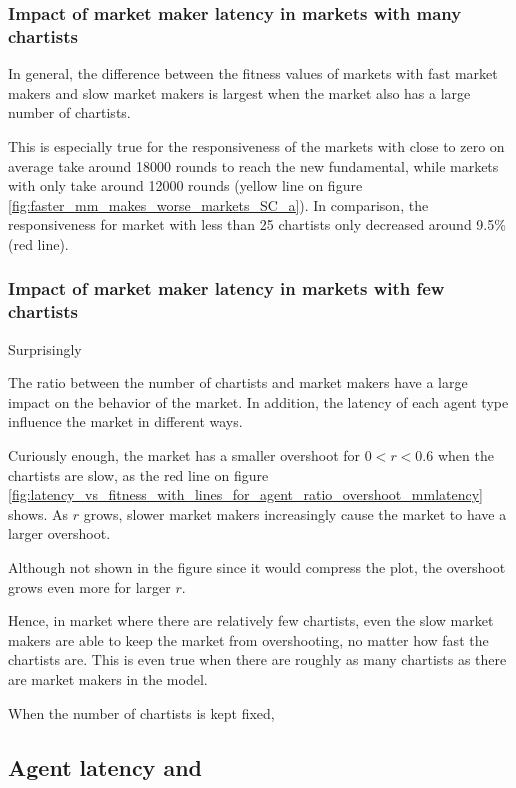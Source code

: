 \subsubsection*{Impact of market maker latency in markets with many chartists}
In general, the difference between the fitness values of markets with fast market makers and slow market makers is largest when the market also has a large number of chartists. 


This is especially true for the responsiveness of the markets with \ssmmlatencymu close to zero on average take around 18000 rounds to reach the new fundamental, while markets with \ssmmlatencymu only take around 12000 rounds (yellow line on figure \ref{fig:faster_mm_makes_worse_markets_SC_a}). In comparison, the responsiveness for market with less than 25 chartists only decreased around 9.5\% (red line).

\subsubsection*{Impact of market maker latency in markets with few chartists}
Surprisingly

The ratio between the number of chartists and market makers have a large impact on the behavior of the market. In addition, the latency of each agent type influence the market in different ways. 

Curiously enough, the market has a smaller overshoot for $0 < r < 0.6$ when the chartists are slow, as the red line on figure \ref{fig:latency_vs_fitness_with_lines_for_agent_ratio_overshoot_mmlatency} shows. As $r$ grows, slower market makers increasingly cause the market to have a larger overshoot. 

Although not shown in the figure since it would compress the plot, the overshoot grows even more for larger $r$. 

Hence, in market where there are relatively few chartists, even the slow market makers are able to keep the market from overshooting, no matter how fast the chartists are. This is even true when there are roughly as many chartists as there are market makers in the model.

When the number of chartists is kept fixed, 






\subsection{Agent latency and }

